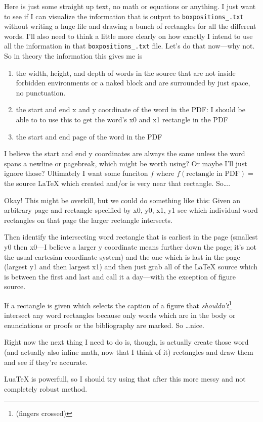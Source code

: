 \documentclass{amsart}
\begin{document}
Here is just some straight up text, no math or equations or anything. I just want to see if I can visualize the information that is output to {\tt boxpositions\_.txt} without writing a huge file and drawing a bunch of rectangles for all the different words. I'll also need to think a little more clearly on how exactly I intend to use all the information in that {\tt boxpositions\_.txt} file. Let's do that now---why not. So in theory the information this gives me is
\begin{enumerate}
\item the width, height, and depth of words in the source that are not inside forbidden environments or a naked block and are surrounded by just space, no punctuation.
\item the start and end x and y coordinate of the word in the PDF: I should be able to to use this to get the word's x0 and x1 rectangle in the PDF
\item the start and end page of the word in the PDF
\end{enumerate}
I believe the start and end y coordinates are always the same unless the word spans a newline or pagebreak, which might be worth using? Or maybe I'll just ignore those? Ultimately I want some funciton $f$ where $f(\text{rectangle in PDF}) = $ the source \LaTeX{} which created and/or is very near that rectangle. So\dots.

Okay! This might be overkill, but we could do something like this:
Given an arbitrary page and rectangle specified by x0, y0, x1, y1 see which individual word rectangles on that page the larger rectangle intersects.

Then identify the intersecting word rectangle that is earliest in the page (smallest y0 then x0---I believe a larger y coordinate means further down the page; it's not the usual cartesian coordinate system) and the one which is last in the page (largest y1 and then largest x1) and then just grab all of the \LaTeX{} source which is between the first and last and call it a day---with the exception of figure source.

If a rectangle is given which selects the caption of a figure that \textit{shouldn't}\footnote{(fingers crossed)} intersect any word rectangles because only words which are in the body or enunciations or proofs or the bibliography are marked. So \dots nice.

Right now the next thing I need to do is, though, is actually create those word (and actually also inline math, now that I think of it) rectangles and draw them and see if they're accurate.

Lua\TeX{} is powerfull, so I should try using that after this more messy and not completely robust method.
\end{document}
